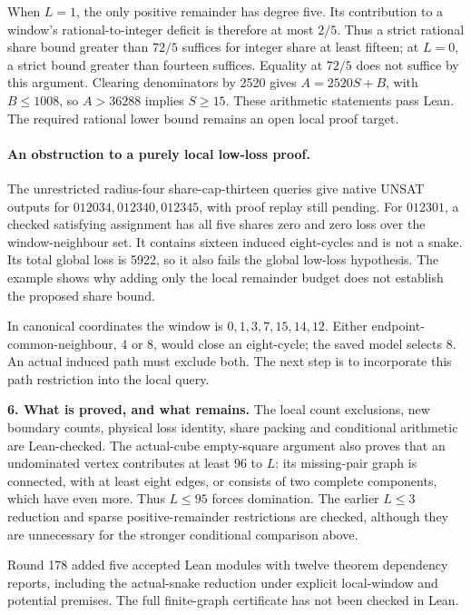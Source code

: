 \documentclass[11pt,a4paper]{article}
\begin{document}
When $L=1$, the only positive remainder has degree five. Its contribution
to a window's rational-to-integer deficit is therefore at most $2/5$.
Thus a strict rational share bound greater than $72/5$ suffices for
integer share at least fifteen; at $L=0$, a strict bound greater than
fourteen suffices. Equality at $72/5$ does not suffice by this argument.
Clearing denominators by 2520 gives $A=2520S+B$, with $B\le1008$,
so $A>36288$ implies $S\ge15$. These arithmetic statements pass Lean.
The required rational lower bound remains an open local proof target.

\paragraph{An obstruction to a purely local low-loss proof.}
The unrestricted radius-four share-cap-thirteen queries give native UNSAT
outputs for $012034,012340,012345$, with proof replay still pending.
For $012301$, a checked satisfying assignment has all five shares zero
and zero loss over the window-neighbour set. It contains sixteen induced
eight-cycles and is not a snake. Its total global loss is 5922, so it
also fails the global low-loss hypothesis. The example shows why adding
only the local remainder budget does not establish the proposed share bound.

In canonical coordinates the window is $0,1,3,7,15,14,12$.
Either endpoint-common-neighbour, 4 or 8, would close an eight-cycle;
the saved model selects 8. An actual induced path must exclude both.
The next step is to incorporate this path restriction into the local query.

\textbf{6. What is proved, and what remains.}
The local count exclusions, new boundary counts, physical loss identity,
share packing and conditional arithmetic are Lean-checked. The actual-cube
empty-square argument also proves that an undominated vertex contributes
at least 96 to $L$: its missing-pair graph is connected, with at least
eight edges, or consists of two complete components, which have even more.
Thus $L\le95$ forces domination. The earlier $L\le3$ reduction and sparse
positive-remainder restrictions are checked, although they are unnecessary
for the stronger conditional comparison above.

Round 178 added five accepted Lean modules with twelve theorem dependency
reports, including the actual-snake reduction under explicit local-window
and potential premises. The full finite-graph certificate has not been
checked in Lean.
\end{document}
